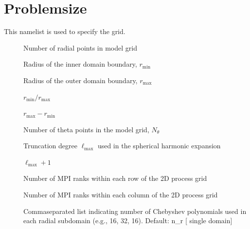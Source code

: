 \documentclass[letterpaper,11pt,english]{sphinxmanual}
\begin{document}
\section{Problemsize}
\label{\detokenize{doc/source/Namelist_Definitions/Namelist_Variables:problemsize}}
\sphinxAtStartPar
This namelist is used to specify the grid.
\begin{description}
\item[{}] \leavevmode
\sphinxAtStartPar
Number of radial points in model grid

\item[{}] \leavevmode
\sphinxAtStartPar
Radius of the inner domain boundary, \(r_\mathrm{min}\)

\item[{}] \leavevmode
\sphinxAtStartPar
Radius of the outer domain boundary, \(r_\mathrm{max}\)

\item[{}] \leavevmode
\sphinxAtStartPar
\({r_\mathrm{min}}/{r_\mathrm{max}}\)

\item[{}] \leavevmode
\sphinxAtStartPar
\(r_\mathrm{max}-r_\mathrm{min}\)

\item[{}] \leavevmode
\sphinxAtStartPar
Number of theta points in the model grid, \(N_\theta\)

\item[{}] \leavevmode
\sphinxAtStartPar
Truncation degree \(\ell_\mathrm{max}\) used in the spherical harmonic expansion

\item[{}] \leavevmode
\sphinxAtStartPar
\(\ell_\mathrm{max}+1\)

\item[{}] \leavevmode
\sphinxAtStartPar
Number of MPI ranks within each row of the 2\sphinxhyphen{}D process grid

\item[{}] \leavevmode
\sphinxAtStartPar
Number of MPI ranks within each column of the 2\sphinxhyphen{}D process grid

\item[{}] \leavevmode
\sphinxAtStartPar
Comma\sphinxhyphen{}separated list indicating number of Chebyshev polynomials used in each radial subdomain (e.g., 16, 32, 16). Default: n\_r {[} single domain{]}


\end{description}
\end{document}

